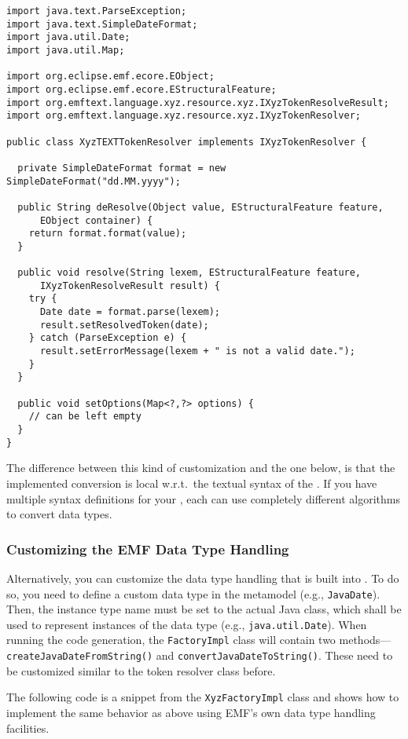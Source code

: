 \begin{lstlisting}
import java.text.ParseException;
import java.text.SimpleDateFormat;
import java.util.Date;
import java.util.Map;

import org.eclipse.emf.ecore.EObject;
import org.eclipse.emf.ecore.EStructuralFeature;
import org.emftext.language.xyz.resource.xyz.IXyzTokenResolveResult;
import org.emftext.language.xyz.resource.xyz.IXyzTokenResolver;

public class XyzTEXTTokenResolver implements IXyzTokenResolver {
  
  private SimpleDateFormat format = new SimpleDateFormat("dd.MM.yyyy");
  
  public String deResolve(Object value, EStructuralFeature feature, 
      EObject container) {
    return format.format(value);
  }
  
  public void resolve(String lexem, EStructuralFeature feature, 
      IXyzTokenResolveResult result) {
    try {
      Date date = format.parse(lexem);
      result.setResolvedToken(date);
    } catch (ParseException e) {
      result.setErrorMessage(lexem + " is not a valid date.");
    }
  }
  
  public void setOptions(Map<?,?> options) {
    // can be left empty
  }
}
\end{lstlisting}

The difference between this kind of customization and the one below, is
that the implemented conversion is local w.r.t.~the textual syntax of the \DSL.
If you have multiple syntax definitions for your \DSL, each can use completely
different algorithms to convert data types.

\subsubsection{Customizing the EMF Data Type Handling}

Alternatively, you can customize the data type handling that is built into \EMF.
To do so, you need to define a custom data type in the metamodel (e.g.,
\texttt{JavaDate}). Then, the instance type name must be set to the actual Java
class, which shall be used to represent instances of the data type (e.g.,
\texttt{java.util.Date}). When running the \EMF code generation, the
\texttt{FactoryImpl} class will contain two
methods---\texttt{createJavaDateFromString()} and
\texttt{convertJavaDateToString()}. These need to be customized similar to the
token resolver class before.

The following code is a snippet from the \texttt{XyzFactoryImpl} class and shows
how to implement the same behavior as above using EMF's own data type handling
facilities.

